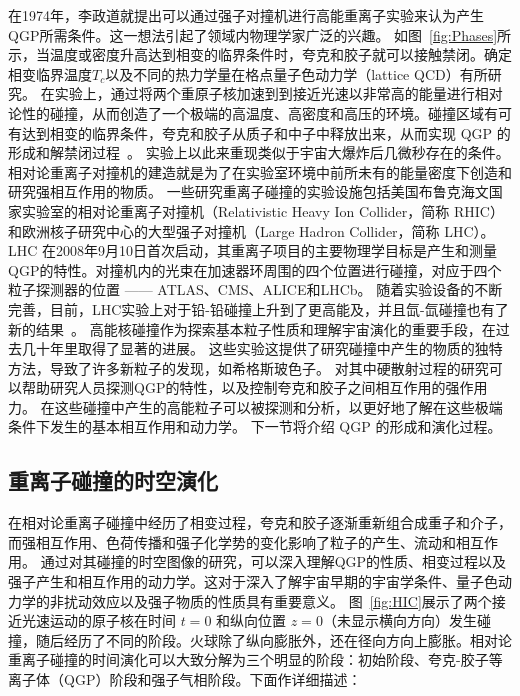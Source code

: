	在1974年，李政道就提出可以通过强子对撞机进行高能重离子实验来认为产生QGP所需条件。这一想法引起了领域内物理学家广泛的兴趣。
	如图~\ref{fig:Phases}所示，当温度或密度升高达到相变的临界条件时，夸克和胶子就可以接触禁闭。确定相变临界温度$T_c$以及不同的热力学量在格点量子色动力学（lattice QCD）有所研究。
	在实验上，通过将两个重原子核加速到到接近光速以非常高的能量进行相对论性的碰撞，从而创造了一个极端的高温度、高密度和高压的环境。碰撞区域有可有达到相变的临界条件，夸克和胶子从质子和中子中释放出来，从而实现 QGP 的形成和解禁闭过程~\parencite{Politzer:1973fx,Freedman:1976xs,Shuryak:1977ut}。
	实验上以此来重现类似于宇宙大爆炸后几微秒存在的条件。
	 相对论重离子对撞机的建造就是为了在实验室环境中前所未有的能量密度下创造和研究强相互作用的物质。
	一些研究重离子碰撞的实验设施包括美国布鲁克海文国家实验室的相对论重离子对撞机（Relativistic Heavy Ion Collider，简称 RHIC）和欧洲核子研究中心的大型强子对撞机（Large Hadron Collider，简称 LHC）。
	LHC 在2008年9月10日首次启动，其重离子项目的主要物理学目标是产生和测量QGP的特性。对撞机内的光束在加速器环周围的四个位置进行碰撞，对应于四个粒子探测器的位置 —— ATLAS、CMS、ALICE和LHCb。
	随着实验设备的不断完善，目前，LHC实验上对于铅-铅碰撞上升到了更高能及，并且氙-氙碰撞也有了新的结果~\parencite{CMS:2023pad,Feuillard:2023xgh,Stanek-Maslouska:2023xrq,ATLAS:2023vms,ATLAS:2023xzy}。
	高能核碰撞作为探索基本粒子性质和理解宇宙演化的重要手段，在过去几十年里取得了显著的进展。
	这些实验这提供了研究碰撞中产生的物质的独特方法，导致了许多新粒子的发现，如希格斯玻色子。
	对其中硬散射过程的研究可以帮助研究人员探测QGP的特性，以及控制夸克和胶子之间相互作用的强作用力。
	在这些碰撞中产生的高能粒子可以被探测和分析，以更好地了解在这些极端条件下发生的基本相互作用和动力学。
	下一节将介绍 QGP 的形成和演化过程。

\subsection{重离子碰撞的时空演化}

	在相对论重离子碰撞中经历了相变过程，夸克和胶子逐渐重新组合成重子和介子，而强相互作用、色荷传播和强子化学势的变化影响了粒子的产生、流动和相互作用。
	通过对其碰撞的时空图像的研究，可以深入理解QGP的性质、相变过程以及强子产生和相互作用的动力学。这对于深入了解宇宙早期的宇宙学条件、量子色动力学的非扰动效应以及强子物质的性质具有重要意义。
	图~\ref{fig:HIC}展示了两个接近光速运动的原子核在时间 $t=0$ 和纵向位置 $z=0$（未显示横向方向）发生碰撞，随后经历了不同的阶段。火球除了纵向膨胀外，还在径向方向上膨胀。相对论重离子碰撞的时间演化可以大致分解为三个明显的阶段：初始阶段、夸克-胶子等离子体（QGP）阶段和强子气相阶段。下面作详细描述：

